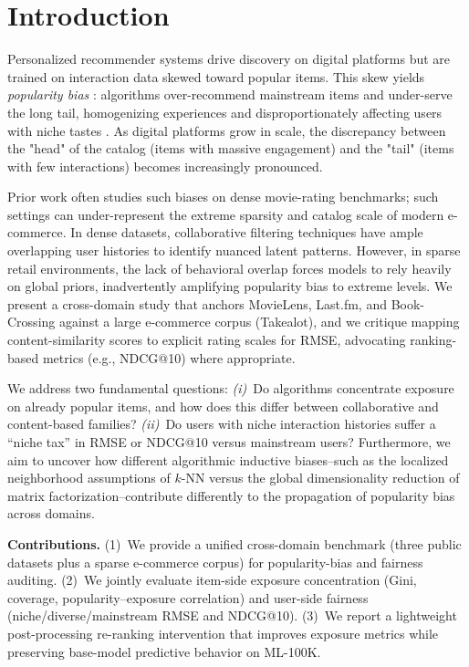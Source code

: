 \documentclass[conference]{IEEEtran}
\begin{document}
\section{Introduction}
\label{sec:intro}

Personalized recommender systems drive discovery on digital platforms but are trained on interaction data skewed toward popular items. This skew yields \emph{popularity bias} \cite{abdollahpouri2017controlling}: algorithms over-recommend mainstream items and under-serve the long tail, homogenizing experiences and disproportionately affecting users with niche tastes \cite{abdollahpouri2019unfairness}. As digital platforms grow in scale, the discrepancy between the "head" of the catalog (items with massive engagement) and the "tail" (items with few interactions) becomes increasingly pronounced.

Prior work often studies such biases on dense movie-rating benchmarks; such settings can under-represent the extreme sparsity and catalog scale of modern e-commerce. In dense datasets, collaborative filtering techniques have ample overlapping user histories to identify nuanced latent patterns. However, in sparse retail environments, the lack of behavioral overlap forces models to rely heavily on global priors, inadvertently amplifying popularity bias to extreme levels. We present a cross-domain study that anchors MovieLens, Last.fm, and Book-Crossing against a large e-commerce corpus (Takealot), and we critique mapping content-similarity scores to explicit rating scales for RMSE, advocating ranking-based metrics (e.g., NDCG@10) where appropriate.

We address two fundamental questions: \emph{(i)}~Do algorithms concentrate exposure on already popular items, and how does this differ between collaborative and content-based families? \emph{(ii)}~Do users with niche interaction histories suffer a ``niche tax'' in RMSE or NDCG@10 versus mainstream users? Furthermore, we aim to uncover how different algorithmic inductive biases--such as the localized neighborhood assumptions of $k$-NN versus the global dimensionality reduction of matrix factorization--contribute differently to the propagation of popularity bias across domains.

\textbf{Contributions.} (1)~We provide a unified cross-domain benchmark (three public datasets plus a sparse e-commerce corpus) for popularity-bias and fairness auditing. (2)~We jointly evaluate item-side exposure concentration (Gini, coverage, popularity--exposure correlation) and user-side fairness (niche/diverse/mainstream RMSE and NDCG@10). (3)~We report a lightweight post-processing re-ranking intervention that improves exposure metrics while preserving base-model predictive behavior on ML-100K.
\end{document}
